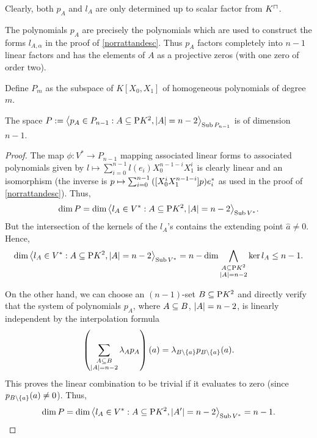 \begin{remark}
    Clearly, both $p_A$ and $l_A$ are only determined up to scalar factor from $\units K$.
\end{remark}

\begin{remark}
    The polynomials $p_A$ are precisely the polynomials which are used to construct the forms $l_{A,\alpha}$ in the proof of \autoref{norrattandesc}. Thus $p_A$ factors completely into $n-1$ linear factors and has the elements of $A$ as a projective zeros (with one zero of order two).
\end{remark}

\begin{definition}
    Define $P_m$ as the subspace of $K[X_0,X_1]$ of homogeneous polynomials of degree $m$.
\end{definition}

\begin{lemma}
    The space $P:=\gen{p_A\in P_{n-1}:A\setleq \proj{K^2},\card A=n-2}_{\Sub P_{n-1}}$ is of dimension $n-1$.
\end{lemma}

\begin{proof}
    The map $\phi:V^{\ast}\to P_{n-1}$ mapping associated linear forms to associated polynomials given by $l\mapsto \sum_{i=0}^{n-1}{l(e_i)X_0^{n-1-i}X_1^i}$ is clearly linear and an isomorphism (the inverse is $p\mapsto\sum_{i=0}^{n-1}{([X_0^i X_1^{n-1-i}]p){e}^{\ast}_i}$ as used in the proof of \autoref{norrattandesc}). Thus,
    $$
\dim{P}=\dim\gen{l_A\in V^{\ast}:A\setleq \proj{K^2},\card A=n-2}_{\Sub\dual V}.
$$
But the intersection of the kernels of the $l_A$'s contains the extending point $\hat{a}\neq 0$. Hence, 
$$
\dim\gen{l_A\in V^{\ast}:A\setleq \proj{K^2},\card A=n-2}_{\Sub \dual V}=n-\dim\Meet_{\substack{A\setleq\proj{K^2}\\ \card A=n-2}}{\ker{l_A}}\leq n-1.
$$

On the other hand, we can choose an $(n-1)$-set $B\subseteq \mathrm{P}{K^2}$ and directly verify that the system of polynomials $p_A$, where $A\subseteq B$, $\left\vert{A}\right\vert=n-2$, is linearly independent by the interpolation formula
$$
\left(\sum_{\substack{A\setleq B\\ \card{A}=n-2}}{\lambda_A p_A}\right)(a)=\lambda_{B\setminus\set{a}}p_{B\setminus\set{a}}(a).
$$
This proves the linear combination to be trivial if it evaluates to zero (since $p_{B\setminus\set{a}}(a)\neq 0$).
Thus,
$$
\dim{P}=\dim\gen{l_{A}\in V^{\ast}:A\setleq \proj{K^2},\card{A'}=n-2}_{\Sub \dual V}=n-1.
$$
\end{proof}

